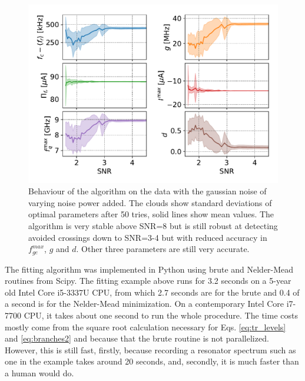 \documentclass[%
 aip,
 amsmath,amssymb,
 reprint,%
]{revtex4-1}
\begin{document}
\begin{figure}
	\centering
	\includegraphics[width=\linewidth]{noise_test}
	\caption{Behaviour of the algorithm on the data with the gaussian noise of varying noise power added. The clouds show standard deviations of optimal parameters after 50 tries, solid lines show mean values. The algorithm is very stable above SNR=8 but is still robust at detecting avoided crossings down to SNR=3-4 but with reduced accuracy in $f_{ge}^{max}$, $g$ and $d$. Other three parameters are still very accurate.}
	\label{fig:noise_test}
\end{figure}
The fitting algorithm was implemented in Python using brute and Nelder-Mead routines from Scipy. The fitting example above runs for 3.2 seconds on a 5-year old Intel Core i5-3337U CPU, from which 2.7 seconds are for the brute and 0.4 of a second is for the Nelder-Mead minimization. On a contemporary Intel Core i7-7700 CPU, it takes about one second to run the whole procedure. The time costs mostly come from the square root calculation necessary for Eqs. \eqref{eq:tr_levels} and \eqref{eq:branches2} and because that the brute routine is not parallelized. However, this is still fast, firstly, because recording a resonator spectrum such as one in the example takes around 20 seconds, and, secondly, it is much faster than a human would do. 
\end{document}
